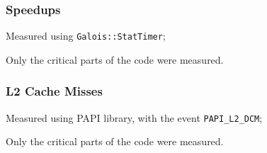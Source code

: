\begin{frame}
	\frametitle{Speedups}
	\begin{figure}
	\end{figure}

	Measured using \texttt{Galois::StatTimer};

	Only the critical parts of the code were measured.
\end{frame}

\begin{frame}
	\frametitle{L2 Cache Misses}
	\begin{figure}
	\end{figure}

	Measured using PAPI library, with the event \texttt{PAPI\_L2\_DCM};

	Only the critical parts of the code were measured.

\end{frame}